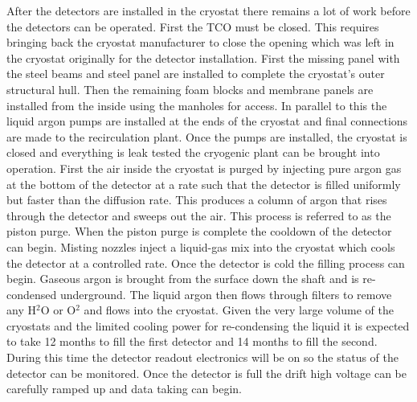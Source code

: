 After the detectors are installed in the cryostat there remains a lot of work before the detectors can be operated. First the TCO must be closed. This requires bringing back the cryostat manufacturer to close the opening which was left in the cryostat originally for the detector installation. First the missing panel with the steel beams and steel panel are installed to complete the cryostat's outer structural hull. Then the remaining foam blocks and membrane panels are installed from the inside using the manholes for access. In parallel to this the liquid argon pumps are installed at the ends of the cryostat and final connections are made to the recirculation plant. Once the pumps are installed, the cryostat is closed and everything is leak tested the cryogenic plant can be brought into operation. First the air inside the cryostat is purged by injecting pure argon gas at the bottom of the detector at a rate such that the detector is filled uniformly but faster than the diffusion rate. This produces a column of argon that rises through the detector and sweeps out the air. This process is referred to as the piston purge. When the piston purge is complete the cooldown of the detector can begin. Misting nozzles inject a liquid-gas mix into the cryostat which cools the detector at a controlled rate. Once the detector is cold the filling process can begin. Gaseous argon is brought from the surface down the shaft and is re-condensed underground. The liquid argon then flows through filters to remove any H$^2$O or O$^2$ and flows into the cryostat. Given the very large volume of the cryostats and the limited cooling power for re-condensing the liquid it is expected to take 12 months to fill the first detector and 14 months to fill the second. During this time the detector readout electronics will be on so the status of the detector can be monitored. Once the detector is full the drift high voltage can be carefully ramped up and data taking can begin.


